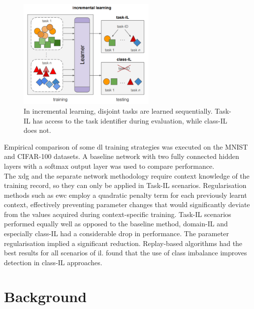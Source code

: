 \begin{figure}[H]
    \centering
    \includegraphics[width=0.6\textwidth]{Images/task_vs_class_il.png}
    \caption{In incremental learning, disjoint tasks are learned sequentially. Task-IL has access to the task identifier during evaluation, while class-IL does not. \citep{masana2022class}}
    \label{fig:task-vs-class-il}
\end{figure}

Empirical comparison of some \acrshort{dl} training strategies was executed on the MNIST \citep{deng2012mnist} and CIFAR-100 \citep{cifar} datasets. A baseline network with two fully connected hidden layers with a softmax output layer was used to compare performance.\\ 
The \acrshort{xdg} and the separate network methodology \citep{masse2018alleviating} require context knowledge of the training record, so they can only be applied in Task-IL scenarios. Regularisation methods such as \acrshort{ewc} \citep{kirkpatrick2017overcoming} employ a quadratic penalty term for each previously learnt context, effectively preventing parameter changes that would significantly deviate from the values acquired during context-specific training. 
Task-IL scenarios performed equally well as opposed to the baseline method, domain-IL and especially class-IL had a considerable drop in performance. The parameter regularisation implied a significant reduction. Replay-based algorithms had the best results for all scenarios of \acrshort{il}. \citep{khare2021unsupervised} found that the use of class imbalance improves detection in class-IL approaches.\\

\section{Background}
\label{sec:Background}
